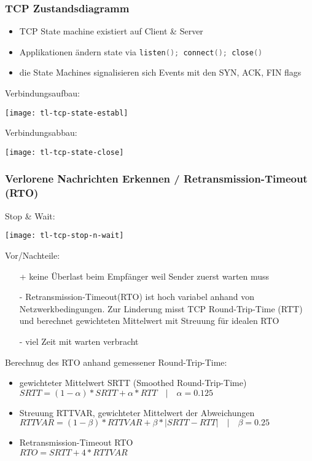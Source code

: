 \subsubsection{TCP Zustandsdiagramm}

\begin{itemize}
    \item TCP State machine existiert auf Client \& Server
    \item Applikationen ändern state via
          \lstinline[language=C]{listen(); connect(); close()}
    \item die State Machines signalisieren sich Events mit den SYN, ACK, FIN flags
\end{itemize}


Verbindungsaufbau:
\begin{center}
    \texttt{[image: tl-tcp-state-establ]}
\end{center}

Verbindungsabbau:
\begin{center}
    \texttt{[image: tl-tcp-state-close]}
\end{center}

\subsubsection{Verlorene Nachrichten Erkennen / Retransmission-Timeout (RTO)}

Stop \& Wait:
\begin{center}
    \texttt{[image: tl-tcp-stop-n-wait]}
\end{center}

Vor/Nachteile:
\begin{itemize}
    \item[+] keine Überlast beim Empfänger weil Sender zuerst warten muss
    \item[-] Retransmission-Timeout(RTO) ist hoch variabel anhand von Netzwerkbedingungen.
        Zur Linderung misst TCP Round-Trip-Time (RTT) und berechnet gewichteten Mittelwert
        mit Streuung für idealen RTO
    \item[-] viel Zeit mit warten verbracht
\end{itemize}

Berechnug des RTO anhand gemessener Round-Trip-Time:
\begin{itemize}
    \item gewichteter Mittelwert SRTT (Smoothed Round-Trip-Time)\\
          $\mathit{SRTT} = (1 - \alpha) * \mathit{SRTT} + \alpha * \mathit{RTT}
              \quad | \quad \alpha = 0.125$
    \item Streuung RTTVAR, gewichteter Mittelwert der Abweichungen\\
          $\mathit{RTTVAR} = (1 - \beta) * RTTVAR + \beta * |\mathit{SRTT} - \mathit{RTT}|
              \quad | \quad \beta = 0.25$
    \item Retransmission-Timeout RTO\\
          $\mathit{RTO} = \mathit{SRTT} + 4 * \mathit{RTTVAR}$
\end{itemize}




